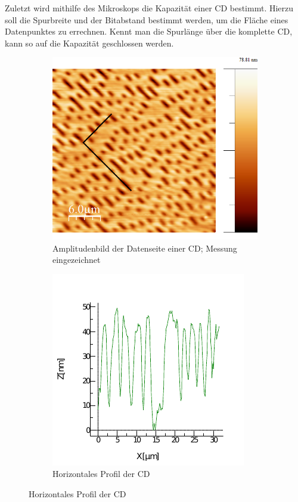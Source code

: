 Zuletzt wird mithilfe des Mikroskops die Kapazität einer CD bestimmt. Hierzu
soll die Spurbreite und der Bitabstand bestimmt werden, um die Fläche eines 
Datenpunktes zu errechnen. Kennt man die Spurlänge über die komplette CD, kann so auf die Kapazität 
geschlossen werden. \par
\begin{figure}
    \centering
    \begin{subfigure}[h]{0.4\textwidth}
        \includegraphics[width=\textwidth]{Mess/cd_paint.png}
        \caption{Amplitudenbild der Datenseite einer CD; Messung eingezeichnet}
        \label{cd}
    \end{subfigure}
    \begin{subfigure}[h]{0.4\textwidth}
        \includegraphics[width=\textwidth]{Mess/profil_cd.pdf}
        \caption{Horizontales Profil der CD}
    \end{subfigure}
\end{figure}
